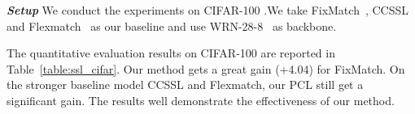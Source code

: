 \noindent\textbf{\textit{Setup}} We conduct the experiments on CIFAR-100 \cite{krizhevsky2009learning}.We take FixMatch~\cite{fixmatch}, CCSSL~\cite{yang2022class} and Flexmatch~\cite{zhang2021flexmatch} as our baseline and use WRN-28-8~\cite{wrn} as backbone. 


The quantitative evaluation results on CIFAR-100 are reported in Table~\ref{table:ssl_cifar}.
Our method gets a great gain (+4.04) for FixMatch. On the stronger baseline model CCSSL and Flexmatch, our PCL still get a significant gain. The results well demonstrate the effectiveness of our method.














